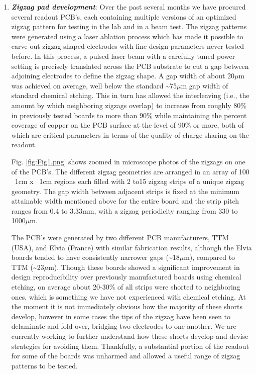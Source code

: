 
\begin{enumerate}

\item	\textbf{\emph{Zigzag pad development}}: Over the past several months we have procured several readout PCB’s, each containing multiple versions of an optimized zigzag pattern for testing in the lab and in a beam test. The zigzag patterns were generated using a laser ablation process which has made it possible to carve out zigzag shaped electrodes with fine design parameters never tested before. In this process, a pulsed laser beam with a carefully tuned power setting is precisely translated across the PCB substrate to cut a gap between adjoining electrodes to define the zigzag shape. A gap width of about 20$\mu$m was achieved on average, well below the standard \textasciitilde75$\mu$m gap width of standard chemical etching. This in turn has allowed the interleaving (i.e., the amount by which neighboring zigzags overlap) to increase from roughly 80\% in previously tested boards to more than 90\% while maintaining the percent coverage of copper on the PCB surface at the level of 90\% or more, both of which are critical parameters in terms of the quality of charge sharing on the readout. 

Fig. \ref{fig:Fig1.png} shows zoomed in microscope photos of the zigzags on one of the PCB’s. The different zigzag geometries are arranged in an array of 100 ~1cm x ~1cm regions each filled with 2 to15 zigzag strips of a unique zigzag geometry. The gap width between adjacent strips is fixed at the minimum attainable width mentioned above for the entire board and the strip pitch ranges from 0.4 to 3.33mm, with a zigzag periodicity ranging from 330 to 1000$\mu$m. 
   
The PCB’s were generated by two different PCB manufacturers, TTM (USA), and Elvia (France) with similar fabrication results, although the Elvia boards tended to have consistently narrower gaps (\textasciitilde18$\mu$m), compared to TTM (\textasciitilde23$\mu$m). Though these boards showed a significant improvement in design reproducibility over previously manufactured boards using chemical etching, on average about 20-30\% of all strips were shorted to neighboring ones, which is something we have not experienced with chemical etching.  At the moment it is not immediately obvious how the majority of these shorts develop, however in some cases the tips of the zigzag have been seen to delaminate and fold over, bridging two electrodes to one another. We are currently working to further understand how these shorts develop and devise strategies for avoiding them. Thankfully, a substantial portion of the readout for some of the boards was unharmed and allowed a useful range of zigzag patterns to be tested. 
   

\end{enumerate}
